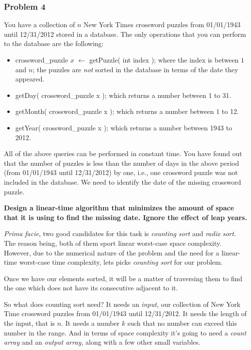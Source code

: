 \documentclass[11pt]{article}
\begin{document}
\subsubsection*{Problem 4} 

You have a collection of $n$ New York Times
crossword puzzles from 01/01/1943 until 12/31/2012 stored in a
database. The only operations that you can perform to the database are
the following:
\begin{itemize}
\item crossword\_puzzle $x$ $\leftarrow$ getPuzzle( int index ); where the
  index is between $1$ and $n$; the puzzles are \emph{not} sorted in the
  database in terms of the date they appeared.
\item getDay( crossword\_puzzle x ); which returns a number between 1
  to 31.
\item getMonth( crossword\_puzzle x ); which returns a number between
  1 to 12.
\item getYear( crossword\_puzzle x ); which returns a number between
  1943 to 2012.
\end{itemize}
All of the above queries can be performed in constant time. You have
found out that the number of puzzles is less than the number of days
in the above period (from 01/01/1943 until 12/31/2012) by one, i.e.,
one crossword puzzle was not included in the database. We need to
identify the date of the missing crossword puzzle.

\textbf{Design a linear-time algorithm that minimizes the amount of space that
it is using to find the missing date. Ignore the effect of leap years.}

\emph{Prima facie}, two good candidates for this task is \emph{counting sort}
and \emph{radix sort}. The reason being, both of them sport linear worst-case
space complexity. However, due to the numerical nature of the problem and the
need for a linear-time worst-case time complexity, lets picks \emph{counting
sort} for our problem.

Once we have our elements sorted, it will be a matter of traversing them to find
the one which does not have its consecutive adjacent to it.

So what does counting sort need? It needs an \emph{input}, our collection of 
New York Time crossword puzzles from 01/01/1943 until 12/31/2012. It needs the
length of the input, that is $n$. It needs a number $k$ such that no number can
exceed this number in the range. And in terms of space complexity it's going
to need a \emph{count array} and an \emph{output array}, along with a few other
small variables.
\end{document}
